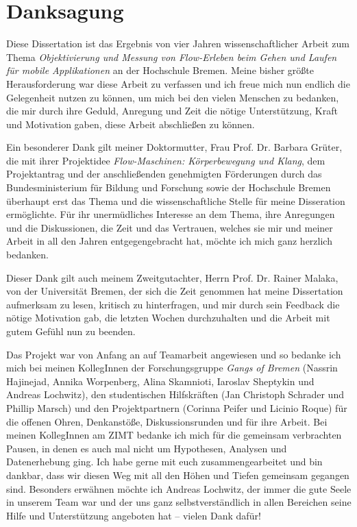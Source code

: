 \section*{Danksagung}

Diese Dissertation ist das Ergebnis von vier Jahren wissenschaftlicher Arbeit zum Thema \emph{Objektivierung und Messung von Flow-Erleben beim Gehen und Laufen für mobile Applikationen} an der Hochschule Bremen. Meine bisher größte Herausforderung war diese Arbeit zu verfassen und ich freue mich nun endlich die Gelegenheit nutzen zu können, um mich bei den vielen Menschen zu bedanken, die mir durch ihre Geduld, Anregung und Zeit die nötige Unterstützung, Kraft und Motivation gaben, diese Arbeit abschließen zu können.

Ein besonderer Dank gilt meiner Doktormutter, Frau Prof. Dr. Barbara Grüter, die mit ihrer Projektidee \emph{Flow-Maschinen: Körperbewegung und Klang}, dem Projektantrag und der anschließenden genehmigten Förderungen durch das Bundesministerium für Bildung und Forschung sowie der Hochschule Bremen überhaupt erst das Thema und die wissenschaftliche Stelle für meine Disseration ermöglichte. Für ihr unermüdliches Interesse an dem Thema, ihre Anregungen und die Diskussionen, die Zeit und das Vertrauen, welches sie mir und meiner Arbeit in all den Jahren entgegengebracht hat, möchte ich mich ganz herzlich bedanken.

Dieser Dank gilt auch meinem Zweitgutachter, Herrn Prof. Dr. Rainer Malaka, von der Universität Bremen, der sich die Zeit genommen hat meine Dissertation aufmerksam zu lesen, kritisch zu hinterfragen, und mir durch sein Feedback die nötige Motivation gab, die letzten Wochen durchzuhalten und die Arbeit mit gutem Gefühl nun zu beenden.

Das Projekt war von Anfang an auf Teamarbeit angewiesen und so bedanke ich mich bei meinen KollegInnen der Forschungsgruppe \emph{Gangs of Bremen} (Nassrin Hajinejad, Annika Worpenberg, Alina Skamnioti, Iaroslav Sheptykin und Andreas Lochwitz), den studentischen Hilfskräften (Jan Christoph Schrader und Phillip Marsch) und den Projektpartnern (Corinna Peifer und Licinio Roque) für die offenen Ohren, Denkanstöße, Diskussionsrunden und für ihre Arbeit. Bei meinen KollegInnen am ZIMT bedanke ich mich für die gemeinsam verbrachten Pausen, in denen es auch mal nicht um Hypothesen, Analysen und Datenerhebung ging. Ich habe gerne mit euch zusammengearbeitet und bin dankbar, dass wir diesen Weg mit all den Höhen und Tiefen gemeinsam gegangen sind. Besonders erwähnen möchte ich Andreas Lochwitz, der immer die gute Seele in unserem Team war und der uns ganz selbstverständlich in allen Bereichen seine Hilfe und Unterstützung angeboten hat -- vielen Dank dafür! 

